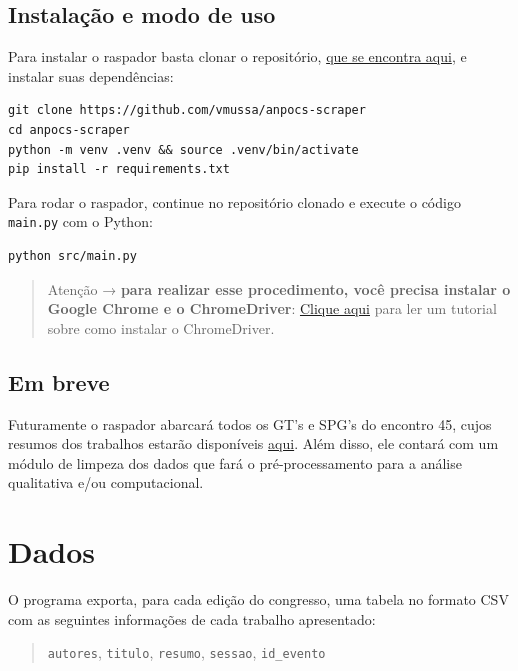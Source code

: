 \documentclass[
]{book}
\begin{document}
\hypertarget{instalauxe7uxe3o-e-modo-de-uso}{%
\subsection{Instalação e modo de uso}\label{instalauxe7uxe3o-e-modo-de-uso}}

Para instalar o raspador basta clonar o repositório, \href{https://github.com/vmussa/anpocs-scraper}{que se encontra aqui}, e instalar suas dependências:

\begin{verbatim}
git clone https://github.com/vmussa/anpocs-scraper
cd anpocs-scraper
python -m venv .venv && source .venv/bin/activate
pip install -r requirements.txt
\end{verbatim}

Para rodar o raspador, continue no repositório clonado e execute o código \texttt{main.py} com o Python:

\begin{verbatim}
python src/main.py
\end{verbatim}

\begin{quote}
Atenção → \textbf{para realizar esse procedimento, você precisa instalar o Google Chrome e o ChromeDriver}: \href{https://chromedriver.chromium.org/getting-started}{Clique aqui} para ler um tutorial sobre como instalar o ChromeDriver.
\end{quote}

\hypertarget{em-breve}{%
\subsection{Em breve}\label{em-breve}}

Futuramente o raspador abarcará todos os GT's e SPG's do encontro 45, cujos resumos dos trabalhos estarão disponíveis \href{https://www.anpocs2021.sinteseeventos.com.br/}{aqui}. Além disso, ele contará com um módulo de limpeza dos dados que fará o pré-processamento para a análise qualitativa e/ou computacional.

\hypertarget{dados-2}{%
\section{Dados}\label{dados-2}}

O programa exporta, para cada edição do congresso, uma tabela no formato CSV com as seguintes informações de cada trabalho apresentado:

\begin{quote}
\texttt{autores}, \texttt{titulo}, \texttt{resumo}, \texttt{sessao}, \texttt{id\_evento}
\end{quote}
\end{document}
